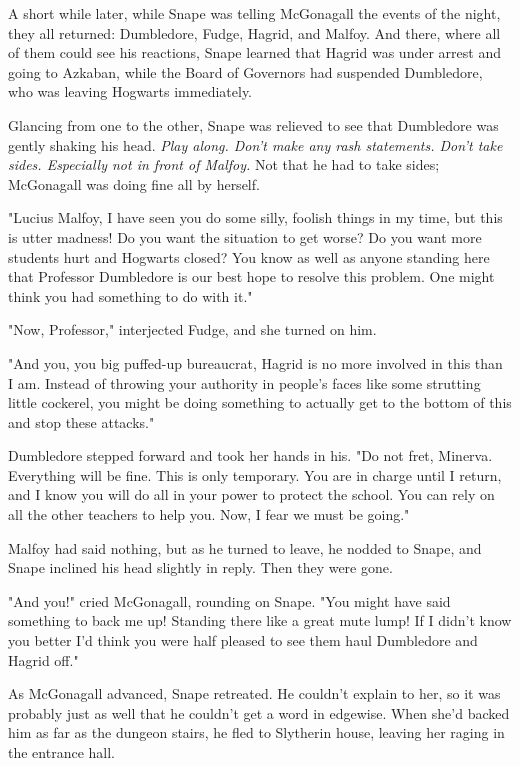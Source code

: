 A short while later, while Snape was telling McGonagall the events of the night, they all returned: Dumbledore, Fudge, Hagrid, and Malfoy. And there, where all of them could see his reactions, Snape learned that Hagrid was under arrest and going to Azkaban, while the Board of Governors had suspended Dumbledore, who was leaving Hogwarts immediately.

Glancing from one to the other, Snape was relieved to see that Dumbledore was gently shaking his head. \emph{Play along. Don't make any rash statements. Don't take sides. Especially not in front of Malfoy.} Not that he had to take sides; McGonagall was doing fine all by herself.

"Lucius Malfoy, I have seen you do some silly, foolish things in my time, but this is utter madness! Do you want the situation to get worse? Do you want more students hurt and Hogwarts closed? You know as well as anyone standing here that Professor Dumbledore is our best hope to resolve this problem. One might think you had something to do with it."

"Now, Professor," interjected Fudge, and she turned on him.

"And you, you big puffed-up bureaucrat, Hagrid is no more involved in this than I am. Instead of throwing your authority in people's faces like some strutting little cockerel, you might be doing something to actually get to the bottom of this and stop these attacks."

Dumbledore stepped forward and took her hands in his. "Do not fret, Minerva. Everything will be fine. This is only temporary. You are in charge until I return, and I know you will do all in your power to protect the school. You can rely on all the other teachers to help you. Now, I fear we must be going."

Malfoy had said nothing, but as he turned to leave, he nodded to Snape, and Snape inclined his head slightly in reply. Then they were gone.

"And you!" cried McGonagall, rounding on Snape. "You might have said something to back me up! Standing there like a great mute lump! If I didn't know you better I'd think you were half pleased to see them haul Dumbledore and Hagrid off."

As McGonagall advanced, Snape retreated. He couldn't explain to her, so it was probably just as well that he couldn't get a word in edgewise. When she'd backed him as far as the dungeon stairs, he fled to Slytherin house, leaving her raging in the entrance hall.

